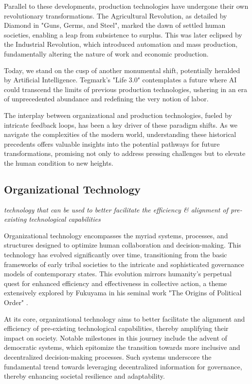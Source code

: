 \documentclass{article}
\begin{document}
Parallel to these developments, production technologies have undergone their own revolutionary transformations. The Agricultural Revolution, as detailed by Diamond in "Guns, Germs, and Steel", marked the dawn of settled human societies, enabling a leap from subsistence to surplus. This was later eclipsed by the Industrial Revolution, which introduced automation and mass production, fundamentally altering the nature of work and economic production\cite{Diamond1997Guns}.

Today, we stand on the cusp of another monumental shift, potentially heralded by Artificial Intelligence. Tegmark's "Life 3.0" contemplates a future where AI could transcend the limits of previous production technologies, ushering in an era of unprecedented abundance and redefining the very notion of labor\cite{Tegmark2017Life}.

The interplay between organizational and production technologies, fueled by intricate feedback loops, has been a key driver of these paradigm shifts. As we navigate the complexities of the modern world, understanding these historical precedents offers valuable insights into the potential pathways for future transformations, promising not only to address pressing challenges but to elevate the human condition to new heights.

\subsection{Organizational Technology}
\label{sec:OrganizationalTechnology}

\textit{technology that can be used to better facilitate the efficiency \& alignment of pre-existing technological capabilities}

Organizational technology encompasses the myriad systems, processes, and structures designed to optimize human collaboration and decision-making. This technology has evolved significantly over time, transitioning from the basic frameworks of early tribal societies to the intricate and sophisticated governance models of contemporary states. This evolution mirrors humanity's perpetual quest for enhanced efficiency and effectiveness in collective action, a theme extensively explored by Fukuyama in his seminal work "The Origins of Political Order" \cite{Fukuyama2011Origins}.

At its core, organizational technology aims to better facilitate the alignment and efficiency of pre-existing technological capabilities, thereby amplifying their impact on society. Notable milestones in this journey include the advent of democratic systems, which epitomize the transition towards more inclusive and decentralized decision-making processes. Such systems underscore the fundamental trend towards leveraging decentralized information for governance, thereby enhancing societal resilience and adaptability.
\end{document}
